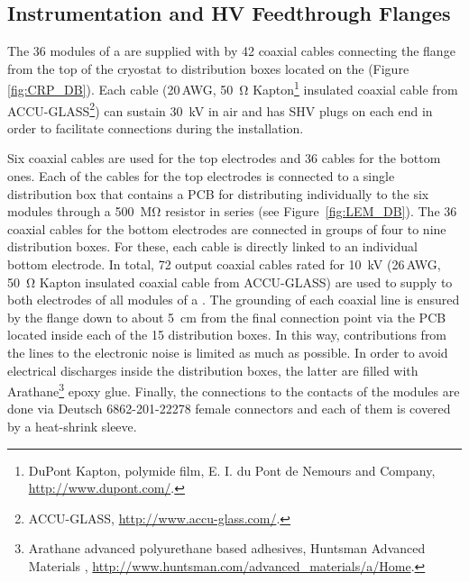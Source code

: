 \subsection{Instrumentation and HV Feedthrough Flanges}
\label{sec:fddp-crp-intfc-FT}
The \num{36}  modules of a  are supplied with  by \num{42} coaxial cables 
connecting the \fdth flange from the top of the cryostat to distribution boxes located on the  (Figure \ref{fig:CRP_DB}). Each cable (\num{20}\,AWG, \SI{50}{\ohm} Kapton\footnote{DuPont\texttrademark{} Kapton, polymide film,  E. I. du Pont de Nemours and Company,  \url{http://www.dupont.com/}.} insulated coaxial cable from ACCU-GLASS\footnote{ACCU-GLASS\texttrademark{}, \url{http://www.accu-glass.com/}.}) can sustain \SI{30}{kV} in air and has SHV plugs on each end in order to facilitate connections during the  installation.

Six coaxial cables are used for the top  electrodes and \num{36} cables for the bottom ones. Each of the cables for the top  electrodes is connected to a single distribution box that contains a PCB for distributing  individually to the six  modules through a \SI{500}{\mega\ohm} resistor in series (see Figure~\ref{fig:LEM_DB}). The \num{36} coaxial cables for the bottom   electrodes are connected in groups of four to nine distribution boxes. 
%
For these, each  cable is directly linked to an individual bottom   electrode. In total, \num{72} output coaxial cables rated for \SI{10}{kV} (\num{26}\,AWG, \SI{50}{\ohm} Kapton insulated coaxial cable from ACCU-GLASS) are used to supply  to both electrodes of all  modules of a . The grounding of each coaxial line is ensured by the \fdth flange down to about \SI{5}{cm} from the  final connection point via the PCB located inside each of the \num{15} distribution boxes. In this way, contributions from the  lines to the electronic noise is limited as much as possible. In order to avoid electrical discharges inside the distribution boxes, the latter are filled with Arathane\footnote{Arathane\texttrademark{} advanced polyurethane based adhesives, Huntsman Advanced Materials , \url{http://www.huntsman.com/advanced\_materials/a/Home}.} epoxy glue. Finally, the connections to the  contacts of the  modules are done via  Deutsch 6862-201-22278 female connectors and each of them is covered by a heat-shrink sleeve. 

